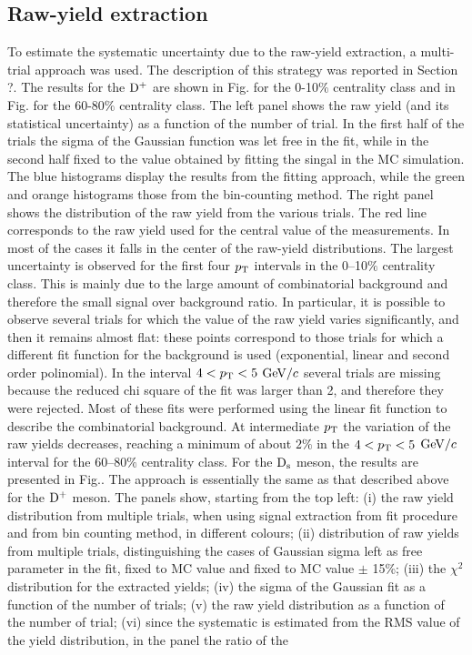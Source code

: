 \subsection{Raw-yield extraction}
To estimate the systematic uncertainty due to the raw-yield extraction, a multi-trial approach was used. The description of this strategy was reported in Section ?.
The results for the ${\rm D^+}$ are shown in Fig. for the 0-10$\%$ centrality class and in Fig. for the 60-80$\%$ centrality class. The left panel shows the raw yield (and its statistical uncertainty) as a function of the number of trial. In the first half of the trials the sigma of the Gaussian function was let free in the fit, while in the second half fixed to the value obtained by fitting the singal in the MC simulation. The blue histograms display the results from the fitting approach, while the green and orange histograms those from the bin-counting method. The right panel shows the distribution of the raw yield from the various trials. The red line corresponds to the raw yield used for the central value of the measurements. In most of the cases it falls in the center of the raw-yield distributions. The largest uncertainty is observed for the first four $p_{\rm T}$ intervals in the 0--10$\%$ centrality class. This is mainly due to the large amount of combinatorial background and therefore the small signal over background ratio. In particular, it is possible to observe several trials for which the value of the raw yield varies significantly, and then it remains almost flat: these points correspond to those trials for which a different fit function for the background is used (exponential, linear and second order polinomial). In the interval $4<p_{\rm T}<5$ $\mathrm{GeV}/c$ several trials are missing because the reduced chi square of the fit was larger than 2, and therefore they were rejected. Most of these fits were performed using the linear fit function to describe the combinatorial background. At intermediate $p_{\rm T}$ the variation of the raw yields decreases, reaching a minimum of about $2\%$ in the $4<p_{\rm T}<5$ $\mathrm{GeV}/c$ interval for the 60--80$\%$ centrality class. For the ${\rm D_s}$ meson, the results are presented in Fig..
The approach is essentially the same as that described above for the ${\rm D^+}$ meson. The panels show, starting from the top left:
(i) the raw yield distribution from multiple trials, when using signal extraction from fit procedure and from bin counting method, in different colours; (ii) distribution of raw yields from multiple trials, distinguishing the cases of Gaussian sigma left as free parameter in the fit, fixed to MC value and fixed to MC value $\pm$ 15\%; (iii) the $\chi^{2}$ distribution for the extracted yields; (iv) the sigma of the Gaussian fit as a function of the number of trials; (v) the raw yield distribution as a function of the number of trial; (vi) since the systematic is estimated from the RMS value of the yield distribution, in the panel the ratio of the 
